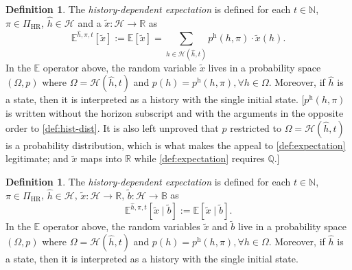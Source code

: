 \documentclass[letterpaper]{article}
\theoremstyle{plain}
\theoremstyle{definition}
\newtheorem{definition}[theorem]{Definition}
\theoremstyle{remark}
\newcommand{\Nats}{\mathbb{N}}
\newcommand{\Real}{\mathbb{R}}
\newcommand{\E}{\mathbb{E}}
\newcommand{\PiHR}{\Pi_{\mathrm{HR}}}
\newcommand{\cc}[1]{\textcolor{ccolor}{[#1]}}
\newcommand{\lean}[1]{\textcolor{blue}{(\emph{LEAN}: \texttt{#1})}}
\newcommand{\leanok}{}
\begin{document}
\begin{definition}\label{def:expect-h}
The \emph{history-dependent expectation} is defined for each $t\in \Nats$, $\pi\in \PiHR$, $\hat{h}\in \mathcal{H}$ and a $\tilde{x}\colon \mathcal{H} \to \Real$ as
\begin{equation*}
\E^{\hat{h}, \pi, t} [\tilde{x}]
:= \E \left[ \tilde{x} \right] 
= \sum_{h \in \mathcal{H}(\hat{h}, t)} p^{\mathrm{h}}(h, \pi) \cdot \tilde{x}(h).
\end{equation*}
In the $\E$ operator above, the random variable $\tilde{x}$ lives in a probability space $(\Omega, p)$ where $\Omega = \mathcal{H}(\hat{h}, t)$ and $p(h) = p^{\mathrm{h}}(h, \pi), \forall h\in \Omega$.
Moreover, if $\hat{h}$ is a state, then it is interpreted as a history with the single initial state.
\cc{$p^{\mathrm{h}}(h,\pi)$ is written without the horizon subscript and with the arguments in the opposite order to \cref{def:hist-dist}. It is also left unproved that $p$ restricted to $\Omega=\mathcal{H}(\hat{h},t)$ is a probability distribution, which is what makes the appeal to \cref{def:expectation} legitimate; and $\tilde{x}$ maps into $\Real$ while \cref{def:expectation} requires $\mathbb{Q}$.}
\end{definition}


\begin{definition}\label{def:expect-h-cnd}
The \emph{history-dependent expectation} is defined for each $t\in \Nats$, $\pi\in \PiHR$, $\hat{h}\in \mathcal{H}$, $\tilde{x}\colon \mathcal{H} \to \Real$, $\tilde{b}\colon \mathcal{H} \to \mathcal{\mathbb{B}}$ as
\begin{equation*}
\E^{\hat{h}, \pi, t} [\tilde{x} \mid \tilde{b} ]
:= \E \left[ \tilde{x} \mid  \tilde{b} \right].
\end{equation*}
In the $\E$ operator above, the random variables $\tilde{x}$ and $\tilde{b}$ live in a probability space $(\Omega, p)$ where $\Omega = \mathcal{H}(\hat{h}, t)$ and $p(h) = p^{\mathrm{h}}(h, \pi), \forall h\in \Omega$.
Moreover, if $\hat{h}$ is a state, then it is interpreted as a history with the single initial state.
\end{definition}
\end{document}
